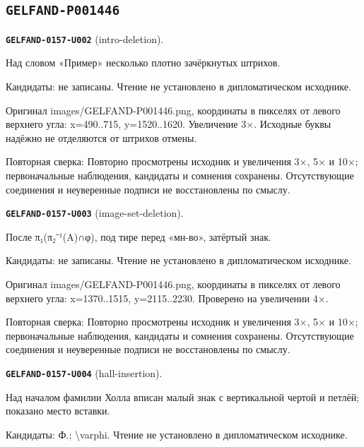 \subsection*{\texttt{GELFAND-P001446}}
\par\noindent\leavevmode{}\label{GELFAND-0157-U002}\label{GELFAND-P001446:intro-deletion}\textbf{\texttt{GELFAND-0157-U002}} (intro-deletion).\nopagebreak[4]\par
Над словом «Пример» несколько плотно зачёркнутых штрихов.\par
Кандидаты: не записаны. Чтение не установлено в дипломатическом исходнике.\par
Оригинал images/GELFAND-P001446.png, координаты в пикселях от левого верхнего угла: x=490..715, y=1520..1620. Увеличение 3×. Исходные буквы надёжно не отделяются от штрихов отмены.\par
Повторная сверка: Повторно просмотрены исходник и увеличения 3×, 5× и 10×; первоначальные наблюдения, кандидаты и сомнения сохранены. Отсутствующие соединения и неуверенные подписи не восстановлены по смыслу.\par\medskip
\par\noindent\leavevmode{}\label{GELFAND-0157-U003}\label{GELFAND-P001446:image-set-deletion}\textbf{\texttt{GELFAND-0157-U003}} (image-set-deletion).\nopagebreak[4]\par
После π₁(π₂⁻¹(A)∩φ), под тире перед «мн-во», затёртый знак.\par
Кандидаты: не записаны. Чтение не установлено в дипломатическом исходнике.\par
Оригинал images/GELFAND-P001446.png, координаты в пикселях от левого верхнего угла: x=1370..1515, y=2115..2230. Проверено на увеличении 4×.\par
Повторная сверка: Повторно просмотрены исходник и увеличения 3×, 5× и 10×; первоначальные наблюдения, кандидаты и сомнения сохранены. Отсутствующие соединения и неуверенные подписи не восстановлены по смыслу.\par\medskip
\par\noindent\leavevmode{}\label{GELFAND-0157-U004}\label{GELFAND-P001446:hall-insertion}\textbf{\texttt{GELFAND-0157-U004}} (hall-insertion).\nopagebreak[4]\par
Над началом фамилии Холла вписан малый знак с вертикальной чертой и петлёй; показано место вставки.\par
Кандидаты: Ф.; \textbackslash{}varphi. Чтение не установлено в дипломатическом исходнике.\par
